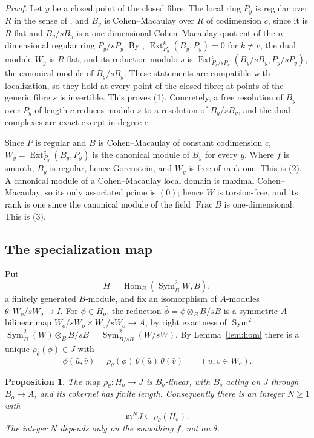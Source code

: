 \documentclass{amsart}
\newtheorem{proposition}[theorem]{Proposition}
\theoremstyle{definition}
\theoremstyle{remark}
\numberwithin{equation}{section}
\newcommand{\m}{\mathfrak{m}}
\DeclareMathOperator{\Hom}{Hom}
\DeclareMathOperator{\Ext}{Ext}
\DeclareMathOperator{\Sym}{Sym}
\DeclareMathOperator{\Frac}{Frac}
\begin{document}
\begin{proof}
Let $y$ be a closed point of the closed fibre. The local ring $P_y$ is regular over $R$ in the sense of \cite[(A.5)]{dJvS}, and $B_y$ is Cohen--Macaulay over $R$ of codimension $c$, since it is $R$-flat and $B_y/sB_y$ is a one-dimensional Cohen--Macaulay quotient of the $n$-dimensional regular ring $P_y/sP_y$. By \cite[(A.7) and (A.8)]{dJvS}, $\Ext^k_{P_y}(B_y,P_y)=0$ for $k\ne c$, the dual module $W_y$ is $R$-flat, and its reduction modulo $s$ is $\Ext^c_{P_y/sP_y}(B_y/sB_y,P_y/sP_y)$, the canonical module of $B_y/sB_y$. These statements are compatible with localization, so they hold at every point of the closed fibre; at points of the generic fibre $s$ is invertible. This proves (1). Concretely, a free resolution of $B_y$ over $P_y$ of length $c$ reduces modulo $s$ to a resolution of $B_y/sB_y$, and the dual complexes are exact except in degree $c$.

Since $P$ is regular and $B$ is Cohen--Macaulay of constant codimension $c$, $W_y=\Ext^c_{P_y}(B_y,P_y)$ is the canonical module of $B_y$ for every $y$. Where $f$ is smooth, $B_y$ is regular, hence Gorenstein, and $W_y$ is free of rank one. This is (2). A canonical module of a Cohen--Macaulay local domain is maximal Cohen--Macaulay, so its only associated prime is $(0)$; hence $W$ is torsion-free, and its rank is one since the canonical module of the field $\Frac B$ is one-dimensional. This is (3).
\end{proof}

\subsection{The specialization map}
Put
\[
H=\Hom_B(\Sym^2_BW,B),
\]
a finitely generated $B$-module, and fix an isomorphism of $A$-modules $\theta\colon W_o/sW_o\to I$. For $\phi\in H_o$, the reduction $\bar\phi=\phi\otimes_BB/sB$ is a symmetric $A$-bilinear map $W_o/sW_o\times W_o/sW_o\to A$, by right exactness of $\Sym^2$: $\Sym^2_B(W)\otimes_BB/sB=\Sym^2_{B/sB}(W/sW)$. By Lemma~\ref{lem:hom} there is a unique $\rho_\theta(\phi)\in J$ with
\begin{equation}\label{eq:rho}
\bar\phi(\bar u,\bar v)=\rho_\theta(\phi)\,\theta(\bar u)\,\theta(\bar v)\qquad(u,v\in W_o).
\end{equation}

\begin{proposition}\label{prop:rho}
The map $\rho_\theta\colon H_o\to J$ is $B_o$-linear, with $B_o$ acting on $J$ through $B_o\to A$, and its cokernel has finite length. Consequently there is an integer $N\ge1$ with
\[
\m^NJ\subseteq\rho_\theta(H_o).
\]
The integer $N$ depends only on the smoothing $f$, not on $\theta$.
\end{proposition}
\end{document}
